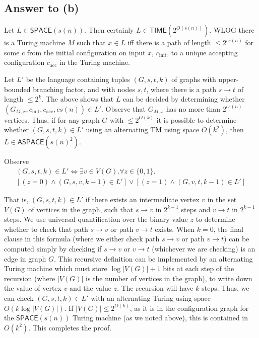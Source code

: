 \documentclass{article}
\newcommand{\TIME}{\mathbf{TIME}}
\def \ASPACE{{\mathsf{ASPACE}}}
\def \SPACE{{\mathsf{SPACE}}}
\def \TIME{{\mathsf{TIME}}}
\begin{document}

\subsection*{Answer to (b)}

Let $L \in \SPACE(s(n))$.  Then certainly $L \in \TIME(2^{O(s(n))})$.
WLOG there is a Turing machine $M$ such that $x \in L$ iff there is a path of length $\leq 2^{c s(n)}$ for some $c$ from the initial configuration on input $x$, $c_\text{init}$, to a unique accepting configuration $c_\text{acc}$ in the Turing machine.

Let $L'$ be the language containing tuples $(G, s, t, k)$ of graphs with upper-bounded branching factor, and with nodes $s, t$, where there is a path $s \to t$ of length $\leq 2^k$.  The above shows that $L$ can be decided by determining whether $(G_{M, x}, c_\text{init}, c_\text{acc}, c s(n)) \in L'$.  Observe that $G_{M, x}$ has no more than $2^{c s(n)}$ vertices.  Thus, if for any graph $G$ with $\leq 2^{O(k)}$ it is possible to determine whether $(G, s, t, k) \in L'$ using an alternating TM using space $O(k^2)$, then $L \in \ASPACE(s(n)^2)$.

Observe
\begin{multline*}
(G, s, t, k) \in L' \iff
\exists v \in V(G) .
\forall z \in \{0, 1\} . \\
[(z = 0) \wedge (G, s, v, k - 1) \in L'] \vee
[(z = 1) \wedge (G, v, t, k - 1) \in L']
\end{multline*}

That is, $(G, s, t, k) \in L'$ if there exists an intermediate vertex $v$ in the set $V(G)$ of vertices in the graph, such that $s \to v$ in $2^{k - 1}$ steps and $v \to t$ in $2^{k - 1}$ steps.  We use universal quantification over the binary value $z$ to determine whether to check that path $s \to v$ or path $v \to t$ exists.
When $k = 0$, the final clause in this formula (where we either check path $s \to v$ or path $v \to t$) can be computed simply by checking if $s \to v$ or $v \to t$ (whichever we are checking) is an edge in graph $G$.
This recursive definition can be implemented by an alternating Turing machine which must store $\log |V(G)| + 1$ bits at each step of the recursion (where $|V(G)|$ is the number of vertices in the graph), to write down the value of vertex $v$ and the value $z$.  The recursion will have $k$ steps.  Thus, we can check $(G, s, t, k) \in L'$ with an alternating Turing using space $O(k \log |V(G)|)$.  If $|V(G)| \leq 2^{O(k)}$, as it is in the configuration graph for the $\SPACE(s(n))$ Turing machine (as we noted above), this is contained in $O(k^2)$.  This completes the proof. 
\end{document}
